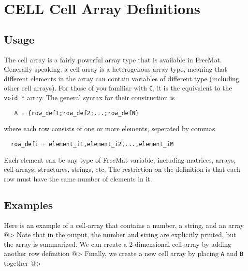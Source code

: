 \section{CELL Cell Array Definitions}

\subsection{Usage}

The cell array is a fairly powerful array type that is available
in FreeMat.  Generally speaking, a cell array is a heterogenous
array type, meaning that different elements in the array can 
contain variables of different type (including other cell arrays).
For those of you familiar with \verb|C|, it is the equivalent to the
\verb|void *| array.  The general syntax for their construction is
\begin{verbatim}
   A = {row_def1;row_def2;...;row_defN}
\end{verbatim}
where each row consists of one or more elements, seperated by
commas
\begin{verbatim}
  row_defi = element_i1,element_i2,...,element_iM
\end{verbatim}
Each element can be any type of FreeMat variable, including
matrices, arrays, cell-arrays, structures, strings, etc.  The
restriction on the definition is that each row must have the
same number of elements in it.
\subsection{Examples}

Here is an example of a cell-array that contains a number,
a string, and an array
@>
Note that in the output, the number and string are explicitly
printed, but the array is summarized.
We can create a 2-dimensional cell-array by adding another
row definition
@>
Finally, we create a new cell array by placing \verb|A| and \verb|B|
together
@>

